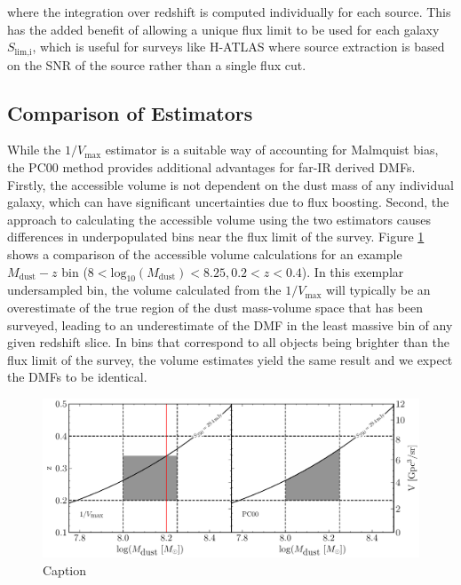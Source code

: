 \noindent where the integration over redshift is computed individually for each source. This has the added benefit of allowing a unique flux limit to be used for each galaxy $S_{\textrm{lim,i}}$, which is useful for surveys like H-ATLAS where source extraction is based on the SNR of the source rather than a single flux cut.

\subsection{Comparison of Estimators}

While the $1/V_{\textrm{max}}$ estimator is a suitable way of accounting for Malmquist bias, the PC00 method provides additional advantages for far-IR derived DMFs. Firstly, the accessible volume is not dependent on the dust mass of any individual galaxy, which can have significant uncertainties due to flux boosting. Second, the approach to calculating the accessible volume using the two estimators causes differences in underpopulated bins near the flux limit of the survey. Figure \ref{fig:volume_comparison} shows a comparison of the accessible volume calculations for an example $M_{\textrm{dust}} - z$ bin ($8 < \textrm{log}_{10}(M_\textrm{dust}) < 8.25, 0.2 < z < 0.4$). In this exemplar undersampled bin, the volume calculated from the $1/V_{\textrm{max}}$ will typically be an overestimate of the true region of the dust mass-volume space that has been surveyed, leading to an underestimate of the DMF in the least massive bin of any given redshift slice. In bins that correspond to all objects being brighter than the flux limit of the survey, the volume estimates yield the same result and we expect the DMFs to be identical.

\begin{figure}
	\centering
	\includegraphics[width=\columnwidth]{Figures/volume_comparison.pdf}
	\caption{Caption}
	\label{fig:volume_comparison}
\end{figure}

